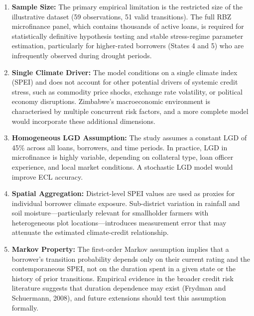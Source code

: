 \documentclass[12pt,a4paper]{article}
\begin{document}
\begin{enumerate}[noitemsep]
    \item \textbf{Sample Size:} The primary empirical limitation is the restricted size of the illustrative dataset (59 observations, 51 valid transitions). The full RBZ microfinance panel, which contains thousands of active loans, is required for statistically definitive hypothesis testing and stable stress-regime parameter estimation, particularly for higher-rated borrowers (States 4 and 5) who are infrequently observed during drought periods.

    \item \textbf{Single Climate Driver:} The model conditions on a single climate index (SPEI) and does not account for other potential drivers of systemic credit stress, such as commodity price shocks, exchange rate volatility, or political economy disruptions. Zimbabwe's macroeconomic environment is characterised by multiple concurrent risk factors, and a more complete model would incorporate these additional dimensions.

    \item \textbf{Homogeneous LGD Assumption:} The study assumes a constant LGD of 45\% across all loans, borrowers, and time periods. In practice, LGD in microfinance is highly variable, depending on collateral type, loan officer experience, and local market conditions. A stochastic LGD model would improve ECL accuracy.

    \item \textbf{Spatial Aggregation:} District-level SPEI values are used as proxies for individual borrower climate exposure. Sub-district variation in rainfall and soil moisture---particularly relevant for smallholder farmers with heterogeneous plot locations---introduces measurement error that may attenuate the estimated climate-credit relationship.

    \item \textbf{Markov Property:} The first-order Markov assumption implies that a borrower's transition probability depends only on their current rating and the contemporaneous SPEI, not on the duration spent in a given state or the history of prior transitions. Empirical evidence in the broader credit risk literature suggests that duration dependence may exist (Frydman and Schuermann, 2008), and future extensions should test this assumption formally.
\end{enumerate}

\end{document}
